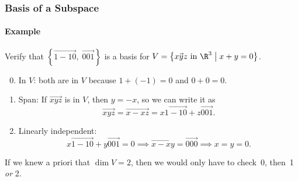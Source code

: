 \begin{frame}
\frametitle{Basis of a Subspace}
\framesubtitle{Example}

Verify that $\left\{ \vec{1 -1 0},\;\vec{0 0 1} \right\}$ is a basis for 
$V = \left\{ \vec{x y z} \text{ in }\R^3\bigm\vert x+y=0 \right\}$.

\begin{webonly}
\begin{enumerate}\setcounter{enumi}{-1}
\item \alert{In $V$:} both are in $V$ because $1 + (-1) = 0$ and $0 + 0 = 0$.

\item \alert{Span:}
  If $\vec{x y z}$ is in $V$, then $y = -x$, so we can write it as
  \[ \vec{x y z} = \vec{x -x z} = x\vec{1 -1 0} + z\vec{0 0 1}. \]

\item \alert{Linearly independent:}
  \[ x\vec{1 -1 0} + y\vec{0 0 1} = 0
  \implies \vec{x -x y} = \vec{0 0 0}
  \implies x = y = 0. \]
\end{enumerate}
\end{webonly}

\pause
If we knew a priori that $\dim V = 2$, then we would only have to check~\alert 0,
then~\alert 1 \emph{or} \alert 2.

\end{frame}




